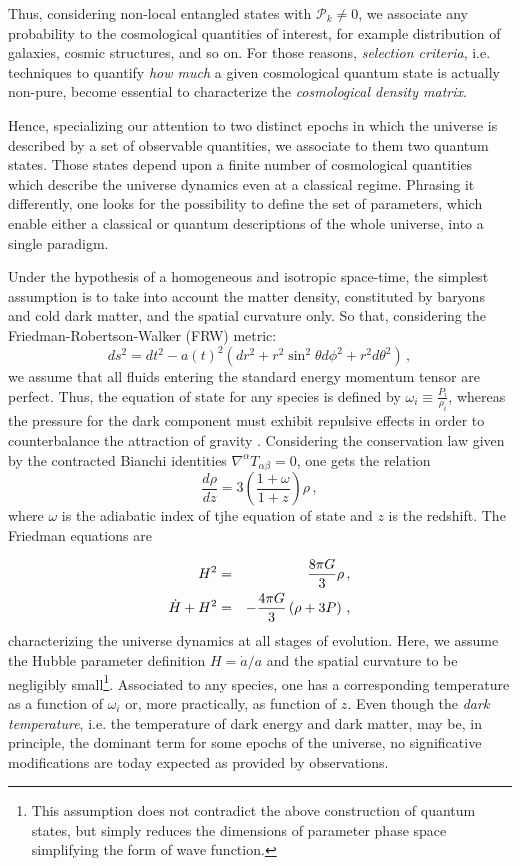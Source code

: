 \documentclass[nofootinbib,prd,superscriptaddress,showpacs,showkeys,]{revtex4}
\begin{document}
Thus, considering non-local entangled states with $\mathcal P_k\neq 0$, we associate any probability to the cosmological quantities of  interest, for example distribution of  galaxies, cosmic structures, and so on. For those reasons, \emph{selection criteria}, i.e. techniques to quantify \emph{how much} a given cosmological quantum state is actually non-pure, become essential to characterize the \emph{cosmological density matrix}.

Hence, specializing our attention to two distinct epochs in which the universe is described by a set of observable quantities, we associate to them two quantum states. Those states depend upon a finite number of cosmological quantities which  describe the universe dynamics even at a classical regime. Phrasing it differently, one looks for the possibility to define the set of parameters,  which enable either a classical or quantum descriptions of the whole universe, into a single paradigm.

Under the hypothesis of a homogeneous and isotropic space-time, the simplest assumption is to take into account the matter density, constituted by baryons and cold dark matter, and the spatial curvature only. So that, considering the Friedman-Robertson-Walker (FRW) metric:
\begin{equation}\label{hgjhg}
ds^2=dt^2-a(t)^2\left(dr^2+r^2\sin^{2}\theta d\phi^2+r^2d\theta^2\right)\,,
\end{equation}
we assume that all fluids entering the standard energy momentum tensor are perfect. Thus, the  equation of state for any species is defined by $\omega_i\equiv\frac{P_i}{\rho_i}$, whereas the pressure for the dark component must exhibit repulsive effects in order to counterbalance the attraction of gravity \cite{iorepulsivo,ionorepulsivo}. Considering the conservation law given by the contracted Bianchi identities $\nabla^\alpha T_{\alpha\beta}=0$, one gets the relation
\begin{equation}\label{utyyyy}
\frac{d\rho}{dz}=3\left(\frac{1+\omega}{1+z}\right)\rho\,,
\end{equation}
where $\omega$ is the adiabatic index of tjhe equation of state and $z$ is the redshift.
The Friedman equations are

\begin{eqnarray}
\label{ave2}
H^2 &=& {8\pi G\over3}\rho\,,\\
\dot H + H^2&=&-{4\pi
G\over3}\left(\rho+3P\right)\,,\nonumber
\end{eqnarray}
characterizing the universe dynamics at all stages of  evolution. Here, we assume the Hubble parameter definition $H=\dot a/a$ and the spatial curvature to be negligibly small\footnote{This assumption does not contradict the above construction of quantum states, but  simply reduces the dimensions of parameter phase space   simplifying  the form of wave function.}. Associated to any species, one  has a corresponding temperature as a  function of $\omega_i$ or, more practically,  as function of $z$. Even though the \emph{dark temperature}, i.e. the temperature of dark energy and dark matter, may be, in principle, the dominant term for some epochs of the universe, no significative  modifications are today expected as provided by observations.
\end{document}
